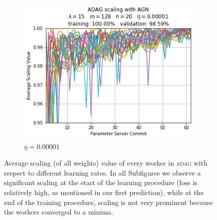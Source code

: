 \begin{figure}[H]
  \begin{subfigure}{.3\textwidth}
    \centering
    \includegraphics[width=\linewidth]{resources/images/plots/adag_agn_mnist/epoch_40/15/00001/scaling_overview}
    \caption{$\eta = 0.00001$}
  \end{subfigure}
  \caption{Average scaling (of all weights) value of every worker in \textsc{adag} with respect to different learning rates. In all Subfigures we observe a significant scaling at the start of the learning procedure (loss is relatively high, as mentioned in our first prediction), while at the end of the training procedure, scaling is not very prominent because the workers converged to a minima.}
  \label{fig:adag_predictions}
\end{figure}

